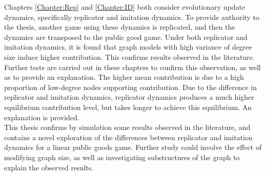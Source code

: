 Chapters \ref{Chapter:Rep} and \ref{Chapter:ID} both consider evolutionary update dynamics, specifically replicator and imitation dynamics. To provide authority to the thesis, another game using these dynamics is replicated, and then the dynamics are transposed to the public good game. Under both replicator and imitation dynamics, it is found that graph models with high variance of degree size induce higher contribution. This confirms results observed in the literature. Further tests are carried out in these chapters to confirm this observation, as well as to provide an explanation. The higher mean contribution is due to a high proportion of low-degree nodes supporting contribution. Due to the difference in replicator and imitation dynamics, replicator dynamics produces a much higher equilibrium contribution level, but takes longer to achieve this equilibrium. An explanation is provided. \\

This thesis confirms by simulation some results observed in the literature, and contains a novel exploration of the differences between replicator and imitation dynamics for a linear public goods game. Further study could involve the effect of modifying graph size, as well as investigating substructures of the graph to explain the observed results. \\

